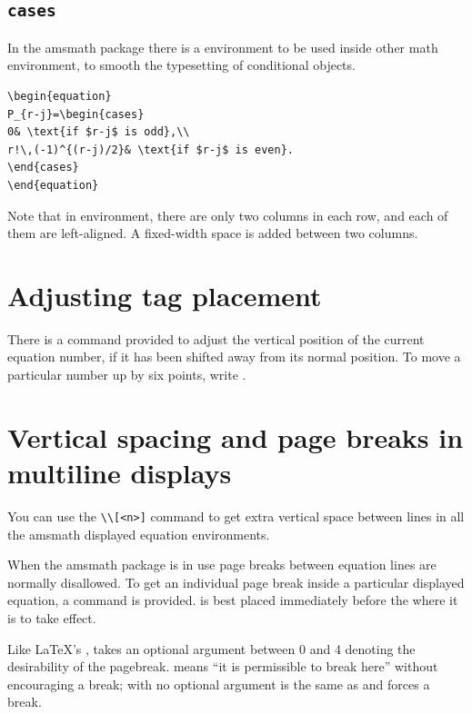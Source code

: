 \documentclass[a4paper,oneside]{book}
\newcommand{\package}[1]{\textsf{#1}}
\newcommand{\envir}[1]{\PVerb{#1}}
\newcommand{\command}[1]{\PVerb{#1}}
\begin{document}
\subsection{\texttt{cases}}
In the amsmath package there is a \envir{cases} environment to be used inside other math environment, to smooth the typesetting of conditional objects.
\begin{lstlisting}
\begin{equation}
P_{r-j}=\begin{cases}
0& \text{if $r-j$ is odd},\\
r!\,(-1)^{(r-j)/2}& \text{if $r-j$ is even}.
\end{cases}
\end{equation}
\end{lstlisting}
Note that in \envir{cases} environment, there are only two columns in each row, and each of them are left-aligned. A fixed-width space is added between two columns.

\section{Adjusting tag placement}
There is a \command{\raisetag} command provided to adjust the vertical position of the current equation number, if it has been shifted away from its normal position. To move a particular number up by six points, write \command{\raisetag{6pt}}.

\section{Vertical spacing and page breaks in multiline displays}
You can use the \lstinline|\\[<n>]| command to get extra vertical space between lines in all the \package{amsmath} displayed equation environments.

When the \package{amsmath} package is in use page breaks between equation lines are normally disallowed.
To get an individual page break inside a particular displayed equation, a \command{\displaybreak} command is provided. \command{\displaybreak} is best placed immediately before the \command{\\} where it is to take effect.

Like \LaTeX{}’s \command{\pagebreak}, \command{\displaybreak} takes an optional argument between 0 and 4 denoting the desirability of the pagebreak. \command{\displaybreak[0]} means ``it is permissible to break here'' without encouraging a break; \command{\displaybreak} with no optional argument is the same as \command{\displaybreak[4]} and forces a break.
\end{document}
